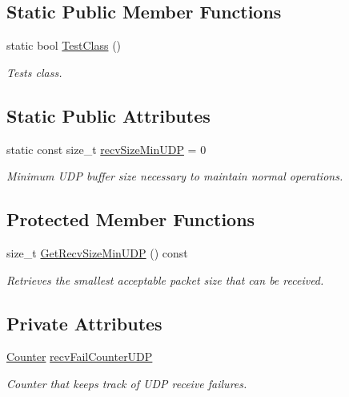 \subsection*{Static Public Member Functions}
\begin{DoxyCompactItemize}
\item 
static bool \hyperlink{class_net_instance_broadcast_a8957a0bbf977ed41f6ad3d4d17850c52}{TestClass} ()
\begin{DoxyCompactList}\small\item\em Tests class. \item\end{DoxyCompactList}\end{DoxyCompactItemize}
\subsection*{Static Public Attributes}
\begin{DoxyCompactItemize}
\item 
\hypertarget{class_net_instance_broadcast_a9cb62b45f97315f11df2ddb86a178b44}{
static const size\_\-t \hyperlink{class_net_instance_broadcast_a9cb62b45f97315f11df2ddb86a178b44}{recvSizeMinUDP} = 0}
\label{class_net_instance_broadcast_a9cb62b45f97315f11df2ddb86a178b44}

\begin{DoxyCompactList}\small\item\em Minimum UDP buffer size necessary to maintain normal operations. \item\end{DoxyCompactList}\end{DoxyCompactItemize}
\subsection*{Protected Member Functions}
\begin{DoxyCompactItemize}
\item 
size\_\-t \hyperlink{class_net_instance_broadcast_a5266d14413003ee8fc66e963c6e81b27}{GetRecvSizeMinUDP} () const 
\begin{DoxyCompactList}\small\item\em Retrieves the smallest acceptable packet size that can be received. \item\end{DoxyCompactList}\end{DoxyCompactItemize}
\subsection*{Private Attributes}
\begin{DoxyCompactItemize}
\item 
\hyperlink{class_counter}{Counter} \hyperlink{class_net_instance_broadcast_a7c4db158cbee7df76d7f266e25a7623e}{recvFailCounterUDP}
\begin{DoxyCompactList}\small\item\em Counter that keeps track of UDP receive failures. \item\end{DoxyCompactList}\end{DoxyCompactItemize}


